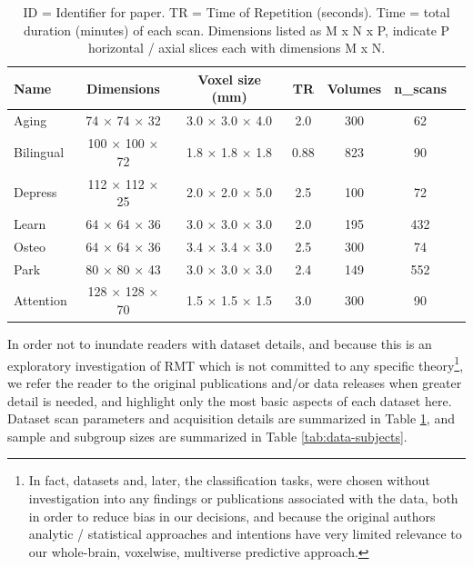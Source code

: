 \documentclass[12pt]{spieman}  %
\begin{document}
\begin{spacing}{2}
\begin{table}[h!]
\caption{
    ID = Identifier for paper. TR = Time of Repetition (seconds).
    Time = total duration (minutes) of each scan. Dimensions listed as M x N x P,
    indicate P horizontal / axial slices each with dimensions M x N.
}
\label{tab:data-dimensions}
\small
\centering
\begin{tabular}{ l c c c c c c }
\hline
\textbf{Name}    & \textbf{Dimensions}  & \textbf{Voxel size (mm)} & \textbf{TR} & \textbf{Volumes} & \textbf{n\_scans} \\
\hline
Aging     & 74 × 74 × 32   & 3.0 × 3.0 × 4.0 & 2.0  & 300 & 62  \\
Bilingual    & 100 × 100 × 72 & 1.8 × 1.8 × 1.8 & 0.88 & 823 & 90  \\
Depress   & 112 × 112 × 25 & 2.0 × 2.0 × 5.0 & 2.5  & 100 & 72  \\
Learn     & 64 × 64 × 36   & 3.0 × 3.0 × 3.0 & 2.0  & 195 & 432 \\
Osteo     & 64 × 64 × 36   & 3.4 × 3.4 × 3.0 & 2.5  & 300 & 74  \\
Park      & 80 × 80 × 43   & 3.0 × 3.0 × 3.0 & 2.4  & 149 & 552 \\
Attention & 128 × 128 × 70 & 1.5 × 1.5 × 1.5 & 3.0  & 300 & 90  \\
\hline
\end{tabular}
\end{table}

In order not to inundate readers with dataset details, and because this is an
exploratory investigation of RMT which is not committed to any specific
theory\footnote{In fact, datasets and, later, the classification tasks, were
chosen without investigation into any findings or publications associated with
the data, both in order to reduce bias in our decisions, and because the
original authors analytic / statistical approaches and intentions have very
limited relevance to our whole-brain, voxelwise, multiverse predictive
approach.}, we refer the reader to the original publications and/or data
releases when greater detail is needed, and highlight only the most basic
aspects of each dataset here.  Dataset scan parameters and acquisition details
are summarized in Table \ref{tab:data-dimensions}, and sample and subgroup sizes are
summarized in Table \ref{tab:data-subjects}.


\end{spacing}
\end{document}
